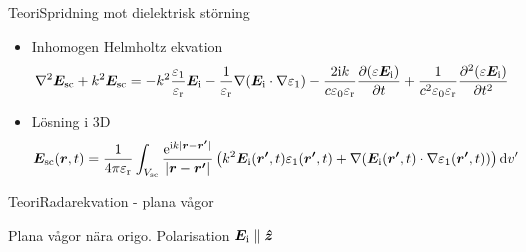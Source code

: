 \documentclass[11pt, final]{beamer}
\begin{document}
	\begin{frame}{Teori}{Spridning mot dielektrisk störning}
		\begin{itemize}
			\item Inhomogen Helmholtz ekvation
			\footnotesize
			\begin{equation*}
				\nabla^2\bm{E}_{\mathrm{sc}} + k^2 \bm{E}_{\mathrm{sc}} =	-k^2 \frac{\varepsilon_1}{\varepsilon_{\mathrm{r}}} \bm{E}_{\mathrm{i}} -\frac{1}{\varepsilon_{\mathrm{r}}}\nabla(\bm{E}_{\mathrm{i}} \cdot \nabla \varepsilon_1) - \frac{2\mathrm{i} k}{c\varepsilon_0\varepsilon_{\mathrm{r}}} \frac{\partial (\varepsilon \bm{E}_{\mathrm{i}})}{\partial t} + \frac{1}{c^2 \varepsilon_0 \varepsilon_{\mathrm{r}}} \frac{\partial^2 (\varepsilon \bm{E}_{\mathrm{i}})}{\partial t^2}
			\end{equation*}
			\pause
			\normalsize
			\item Lösning i 3D
			\footnotesize
			\begin{equation*}
				\bm{E}_{\mathrm{sc}}(\bm{r},t) = \frac{1}{4\pi\varepsilon_{\mathrm{r}}} \int_{V_{\mathrm{sc}}} \frac{\mathrm{e}^{\mathrm{i} k |\bm{r}-\bm{r'}| }}{ |\bm{r}-\bm{r'}|} \left( k^2 \bm{E}_{\mathrm{i}} (\bm{r'},t) \varepsilon_1 (\bm{r'},t) + \nabla (\bm{E}_{\mathrm{i}} (\bm{r'},t) \cdot \nabla \varepsilon_1 (\bm{r'},t)) \right) \mathrm{d}v'
			\end{equation*}
		\end{itemize}
	\end{frame}

	\begin{frame}{Teori}{Radarekvation - plana vågor}
		\resizebox{!}{0.6\textheight}{
			
		}
		
		\pause
		Plana vågor nära origo. Polarisation $\bm{E}_{\mathrm{i}} \parallel \bm{\hat{z}}$
	\end{frame}
	
\end{document}
